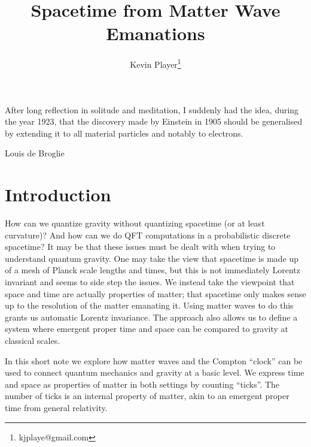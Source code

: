 \documentclass[12pt,a4paper]{article}
\begin{document}
\title{Spacetime from Matter Wave Emanations}
\author[1]{Kevin Player\footnote{kjplaye@gmail.com}}

\maketitle


\epigraph{After long reflection in solitude and meditation, I suddenly had the idea, during the year 1923, that the discovery made by Einstein in 1905 should be generalised by extending it to all material particles and notably to electrons.}{Louis de Broglie}



\section{Introduction}
How can we quantize gravity without quantizing spacetime (or at least curvature)? And how can we do QFT computations in a probabilistic discrete spacetime?  It may be that these issues must be dealt with when trying to understand quantum gravity.  One may take the view that spacetime is made up of a mesh of Planck scale lengths and times, but this is not immediately Lorentz invariant and seems to side step the issues.  We instead take the viewpoint that space and time are actually properties of matter; that spacetime only makes sense up to the resolution of the matter emanating it.  Using matter waves to do this grants us automatic Lorentz invariance.  The approach also allows us to define a system where emergent proper time and space can be compared to gravity at classical scales.

In this short note we explore how matter waves \cite{debroglie} and the Compton ``clock'' \cite{clock} can be used to connect quantum mechanics and gravity at a basic level.  We express time and space as properties of matter in both settings by counting ``ticks''.  The number of ticks is an internal property of matter, akin to an emergent proper time from general relativity.
\end{document}
